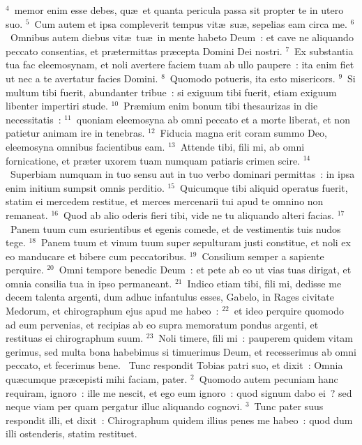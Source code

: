 ${}^{4}$~memor enim esse debes, qu\ae\ et quanta pericula passa sit propter te in utero suo.
${}^{5}$~Cum autem et ipsa compleverit tempus vit\ae\ su\ae , sepelias eam circa me.
${}^{6}$~Omnibus autem diebus vit\ae\ tu\ae\ in mente habeto Deum~: et cave ne aliquando peccato consentias, et pr\ae termittas pr\ae cepta Domini Dei nostri.
${}^{7}$~Ex substantia tua fac eleemosynam, et noli avertere faciem tuam ab ullo paupere~: ita enim fiet ut nec a te avertatur facies Domini.
${}^{8}$~Quomodo potueris, ita esto misericors.
${}^{9}$~Si multum tibi fuerit, abundanter tribue~: si exiguum tibi fuerit, etiam exiguum libenter impertiri stude.
${}^{10}$~Pr\ae mium enim bonum tibi thesaurizas in die necessitatis~:
${}^{11}$~quoniam eleemosyna ab omni peccato et a morte liberat, et non patietur animam ire in tenebras.
${}^{12}$~Fiducia magna erit coram summo Deo, eleemosyna omnibus facientibus eam.
${}^{13}$~Attende tibi, fili mi, ab omni fornicatione, et pr\ae ter uxorem tuam numquam patiaris crimen scire.
${}^{14}$~Superbiam numquam in tuo sensu aut in tuo verbo dominari permittas~: in ipsa enim initium sumpsit omnis perditio.
${}^{15}$~Quicumque tibi aliquid operatus fuerit, statim ei mercedem restitue, et merces mercenarii tui apud te omnino non remaneat.
${}^{16}$~Quod ab alio oderis fieri tibi, vide ne tu aliquando alteri facias.
${}^{17}$~Panem tuum cum esurientibus et egenis comede, et de vestimentis tuis nudos tege.
${}^{18}$~Panem tuum et vinum tuum super sepulturam justi constitue, et noli ex eo manducare et bibere cum peccatoribus.
${}^{19}$~Consilium semper a sapiente perquire.
${}^{20}$~Omni tempore benedic Deum~: et pete ab eo ut vias tuas dirigat, et omnia consilia tua in ipso permaneant.
${}^{21}$~Indico etiam tibi, fili mi, dedisse me decem talenta argenti, dum adhuc infantulus esses, Gabelo, in Rages civitate Medorum, et chirographum ejus apud me habeo~:
${}^{22}$~et ideo perquire quomodo ad eum pervenias, et recipias ab eo supra memoratum pondus argenti, et restituas ei chirographum suum.
${}^{23}$~Noli timere, fili mi~: pauperem quidem vitam gerimus, sed multa bona habebimus si timuerimus Deum, et recesserimus ab omni peccato, et fecerimus bene.
~Tunc respondit Tobias patri suo, et dixit~: Omnia qu\ae cumque pr\ae cepisti mihi faciam, pater.
${}^{2}$~Quomodo autem pecuniam hanc requiram, ignoro~: ille me nescit, et ego eum ignoro~: quod signum dabo ei~? sed neque viam per quam pergatur illuc aliquando cognovi.
${}^{3}$~Tunc pater suus respondit illi, et dixit~: Chirographum quidem illius penes me habeo~: quod dum illi ostenderis, statim restituet.
